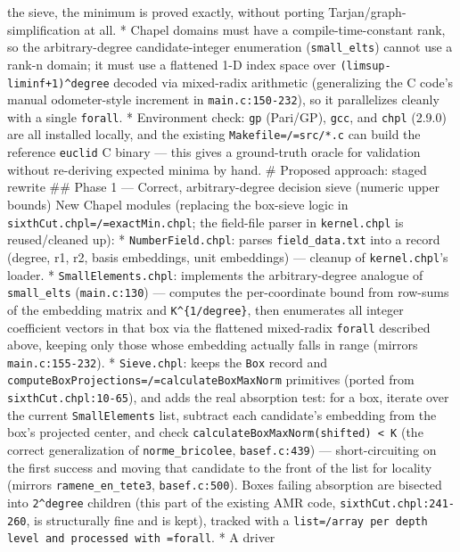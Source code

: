 \documentclass[11pt]{article}
\begin{document}
the sieve, the minimum is proved exactly, without porting
Tarjan/graph-simplification at all. * Chapel domains must have a
compile-time-constant rank, so the arbitrary-degree candidate-integer
enumeration (\texttt{small\_elts}) cannot use a rank-n domain; it must use a
flattened 1-D index space over \texttt{(limsup-liminf+1)\textasciicircum{}degree} decoded via
mixed-radix arithmetic (generalizing the C code's manual odometer-style
increment in \texttt{main.c:150-232}), so it parallelizes cleanly with a single
\texttt{forall}. * Environment check: \texttt{gp} (Pari/GP), \texttt{gcc}, and \texttt{chpl} (2.9.0)
are all installed locally, and the existing \texttt{Makefile=/=src/*.c} can
build the reference \texttt{euclid} C binary --- this gives a ground-truth
oracle for validation without re-deriving expected minima by hand. \#
Proposed approach: staged rewrite \#\# Phase 1 --- Correct,
arbitrary-degree decision sieve (numeric upper bounds) New Chapel
modules (replacing the box-sieve logic in
\texttt{sixthCut.chpl=/=exactMin.chpl}; the field-file parser in \texttt{kernel.chpl}
is reused/cleaned up): * \texttt{NumberField.chpl}: parses \texttt{field\_data.txt}
into a record (degree, r1, r2, basis embeddings, unit embeddings) ---
cleanup of \texttt{kernel.chpl}'s loader. * \texttt{SmallElements.chpl}: implements
the arbitrary-degree analogue of \texttt{small\_elts} (\texttt{main.c:130}) ---
computes the per-coordinate bound from row-sums of the embedding matrix
and \texttt{K\textasciicircum{}\{1/degree\}}, then enumerates all integer coefficient vectors in
that box via the flattened mixed-radix \texttt{forall} described above, keeping
only those whose embedding actually falls in range (mirrors
\texttt{main.c:155-232}). * \texttt{Sieve.chpl}: keeps the \texttt{Box} record and
\texttt{computeBoxProjections=/=calculateBoxMaxNorm} primitives (ported from
\texttt{sixthCut.chpl:10-65}), and adds the real absorption test: for a box,
iterate over the current \texttt{SmallElements} list, subtract each candidate's
embedding from the box's projected center, and check
\texttt{calculateBoxMaxNorm(shifted) < K} (the correct generalization of
\texttt{norme\_bricolee}, \texttt{basef.c:439}) --- short-circuiting on the first
success and moving that candidate to the front of the list for locality
(mirrors \texttt{ramene\_en\_tete3}, \texttt{basef.c:500}). Boxes failing absorption are
bisected into \texttt{2\textasciicircum{}degree} children (this part of the existing AMR code,
\texttt{sixthCut.chpl:241-260}, is structurally fine and is kept), tracked with
a \texttt{list=/array per depth level and processed with =forall}. * A driver
\end{document}
